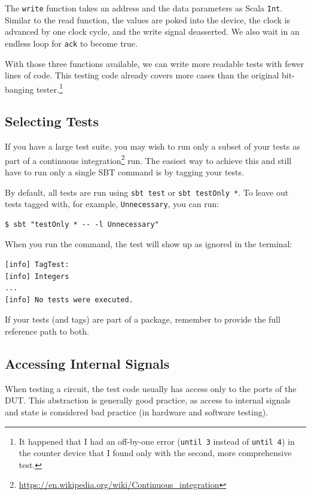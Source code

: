 \documentclass[%
    10pt,
    headinclude, footexclude,
    openright, %
    notitlepage,
    cleardoubleempty,
    headsepline,
    pointlessnumbers,
    bibtotoc, idxtotoc,
    ]{scrbook}
\newcommand{\code}[1]{{\lstinline[basicstyle=\small\ttfamily]{#1}}}
\newcommand{\myref}[2]{\href{#1}{#2}}
\renewcommand{\myref}[2]{{#2}{\footnote{\url{#1}}}}
\begin{document}
The \code{write} function takes an address and the data parameters as Scala \code{Int}.
Similar to the read function, the values are poked into the device, the clock is advanced by one
clock cycle, and the write signal deasserted. We also wait in an endless loop for
\code{ack} to become true.

With those three functions available, we can write more readable tests with fewer lines of code.
This testing code already covers more cases than the original bit-banging
tester.\footnote{It happened that I had an off-by-one error (\code{until 3} instead of \code{until 4})
in the counter device that I found only with the second, more comprehensive test.}


\subsection{Selecting Tests}

If you have a large test suite, you may wish to run only a subset of your tests
as part of a \myref{https://en.wikipedia.org/wiki/Continuous_integration}{continuous integration}
run. The easiest way to achieve this and still have to run only a single SBT command
is by tagging your tests.


\noindent By default, all tests are run using \code{sbt test} or \code{sbt testOnly *}.
To leave out tests tagged with, for example, \code{Unnecessary}, you can run:

\begin{verbatim}
$ sbt "testOnly * -- -l Unnecessary"
\end{verbatim}

\noindent When you run the command, the test will show up as ignored in the terminal:

\begin{verbatim}
[info] TagTest:
[info] Integers
...
[info] No tests were executed.
\end{verbatim}

If your tests (and tags) are part of a package, remember to provide the full
reference path to both.

\subsection{Accessing Internal Signals}


When testing a circuit, the test code usually has access only to the ports of the DUT.
This abstraction is generally good practice, as access to internal signals and state is considered
bad practice (in hardware and software testing).
\end{document}
